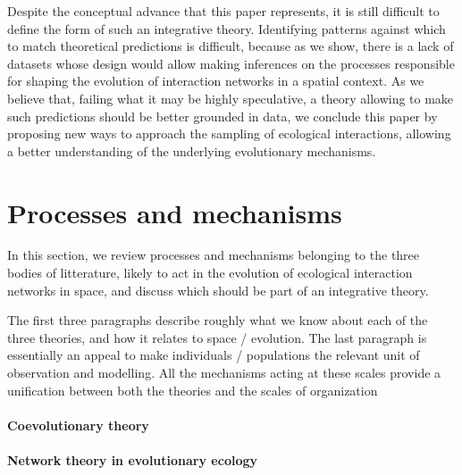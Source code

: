 \documentclass[11pt,oneside]{article}
\begin{document}
Despite the conceptual advance that this paper represents, it is still
difficult to define the form of such an integrative theory. Identifying
patterns against which to match theoretical predictions is difficult, because
as we show, there is a lack of datasets whose design would allow making
inferences on the processes responsible for shaping the evolution of
interaction networks in a spatial context. As we believe that, failing what it
may be highly speculative, a theory allowing to make such predictions should
be better grounded in data, we conclude this paper by proposing new ways to
approach the sampling of ecological interactions, allowing a better understanding
of the underlying evolutionary mechanisms.

%

\section{Processes and mechanisms}

In this section, we review processes and mechanisms belonging to the three
bodies of litterature, likely to act in the evolution of ecological
interaction networks in space, and discuss which should be part of an
integrative theory.

The first three paragraphs describe roughly what we know about each of the three
theories, and how it relates to space / evolution. The last paragraph is
essentially an appeal to make individuals / populations the relevant unit of
observation and modelling. All the mechanisms acting at these scales provide a
unification between both the theories and the scales of organization

\paragraph{Coevolutionary theory}

\paragraph{Network theory in evolutionary ecology}
\end{document}
